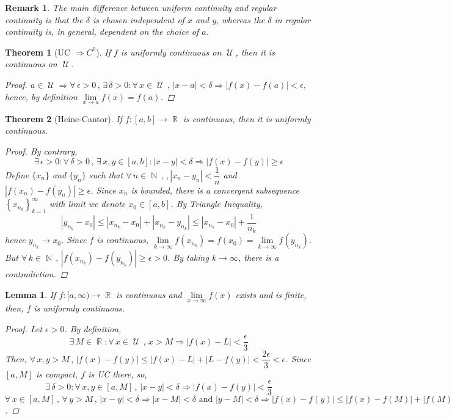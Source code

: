 \documentclass[12pt]{article}
\let\RA\Rightarrow
\newcommand{\Forall}[1]{\forall\,{#1}\,,\,}
\newcommand{\Exist}[1]{\exists\,{#1}:}
\newcommand{\seq}[2]{\left\{{#1}\right\}_{#2 =1}^\infty}
\DeclareMathOperator{\N}{\mathbb{N}}
\DeclareMathOperator{\R}{\mathbb{R}}
\DeclareMathOperator{\U}{\mathcal{U}}
\newtheorem{theorem}{Theorem}[subsection]
\newtheorem{lemma}{Lemma}[subsection]
\newtheorem{remark}{Remark}[subsection]
\begin{document}
\begin{remark}
  The main difference between uniform continuity and regular continuity is that the $\delta$ is chosen independent of $x$ and $y$, whereas the $\delta$ in regular continuity is, in general, dependent on the choice of $a$.
\end{remark}

\begin{theorem}[UC $\RA C^0$]
  If $f$ is uniformly continuous on $\U$, then it is continuous on $\U$.
  \begin{proof}
    $a\in \U\RA\Forall{\epsilon>0}\Exist{\delta>0}\Forall{x\in\U} |x-a|<\delta\RA|f(x)-f(a)|<\epsilon$, hence, by definition $\lim\limits_{x\to a}f(x)=f(a)$.
  \end{proof}
\end{theorem}

\begin{theorem}[Heine-Cantor]
  If $f:[a,b]\to \R$ is continuous, then it is uniformly continuous.
  \begin{proof}
    By contrary, $$\Exist{\epsilon>0}\Forall{\delta>0}\Exist{x,y\in[a,b]}|x-y|<\delta\RA |f(x)-f(y)|\geq\epsilon$$
    Define $\{x_n\}$ and $\{y_n\}$ such that $\Forall{n\in\N},|x_n-y_n|<\dfrac{1}{n}$ and $|f(x_n)-f(y_n)|\geq\epsilon$. Since $x_n$ is bounded, there is a convergent subsequence $\seq{x_{n_k}}{k}$ with limit we denote $x_0\in[a,b]$. By Triangle Inequality, $$|y_{n_k}-x_0|\leq |x_{n_k}-x_0|+|x_{n_k}-y_{n_k}|\leq |x_{n_k}-x_0|+\dfrac{1}{n_k}$$ hence $y_{n_k}\to x_0$. Since $f$ is continuous, $\lim\limits_{k\to\infty}f(x_{n_k})=f(x_0)=\lim\limits_{k\to\infty}f(y_{n_k})$. But $\Forall{k\in\N}|f(x_{n_k})-f(y_{n_k})|\geq \epsilon>0$. By taking $k\to\infty$, there is a contradiction.
  \end{proof}
\end{theorem}

\begin{lemma}
  If $f:[a,\infty)\to\R$ is continuous and $\lim\limits_{x\to\infty}f(x)$ exists and is finite, then, $f$ is uniformly continuous.
  \begin{proof}
    Let $\epsilon>0$. By definition, $$\Exist{M\in\R}\Forall{x\in\U}x>M\RA |f(x)-L|<\dfrac{\epsilon}{3}$$ Then, $\Forall{x,y>M} |f(x)-f(y)|\leq |f(x)-L|+|L-f(y)|<\dfrac{2\epsilon}{3}<\epsilon$. Since $[a,M]$ is compact, $f$ is UC there, so, $$\Exist{\delta>0}\Forall{x,y\in[a,M]}|x-y|<\delta\RA|f(x)-f(y)|<\dfrac{\epsilon}{3}$$
    $\Forall{x\in[a,M]}\Forall{y>M} |x-y|<\delta\RA |x-M|<\delta\text{ and }|y-M|<\delta\RA|f(x)-f(y)|\leq |f(x)-f(M)|+|f(M)-f(y)|<\epsilon$.
  \end{proof}
\end{lemma}
\end{document}

